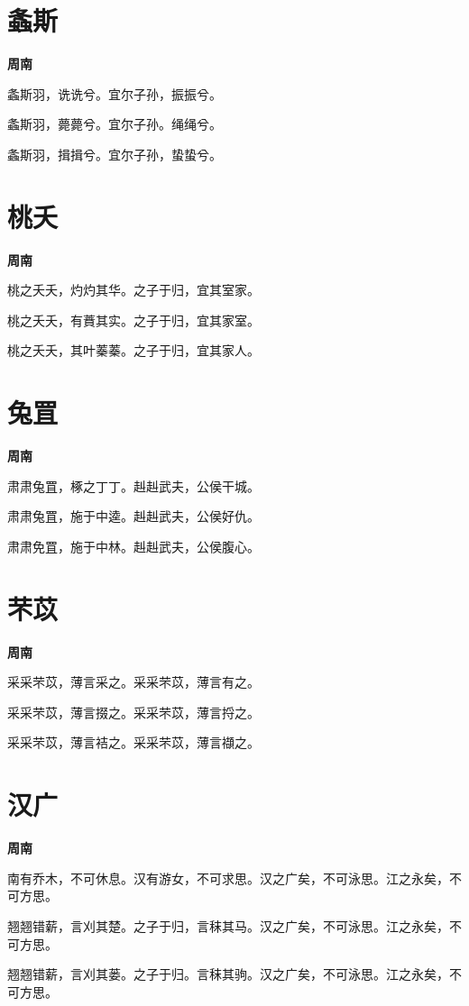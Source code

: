 \documentclass[12pt,a4paper]{ctexbook}
\begin{document}
\section{螽斯}
\textbf{周南}\par\vspace{0.5em}
螽斯羽，诜诜兮。宜尔子孙，振振兮。\par
螽斯羽，薨薨兮。宜尔子孙。绳绳兮。\par
螽斯羽，揖揖兮。宜尔子孙，蛰蛰兮。\par

\section{桃夭}
\textbf{周南}\par\vspace{0.5em}
桃之夭夭，灼灼其华。之子于归，宜其室家。\par
桃之夭夭，有蕡其实。之子于归，宜其家室。\par
桃之夭夭，其叶蓁蓁。之子于归，宜其家人。\par

\section{兔罝}
\textbf{周南}\par\vspace{0.5em}
肃肃兔罝，椓之丁丁。赳赳武夫，公侯干城。\par
肃肃兔罝，施于中逵。赳赳武夫，公侯好仇。\par
肃肃免罝，施于中林。赳赳武夫，公侯腹心。\par

\section{芣苡}
\textbf{周南}\par\vspace{0.5em}
采采芣苡，薄言采之。采采芣苡，薄言有之。\par
采采芣苡，薄言掇之。采采芣苡，薄言捋之。\par
采采芣苡，薄言袺之。采采芣苡，薄言襭之。\par

\section{汉广}
\textbf{周南}\par\vspace{0.5em}
南有乔木，不可休息。汉有游女，不可求思。汉之广矣，不可泳思。江之永矣，不可方思。\par
翘翘错薪，言刈其楚。之子于归，言秣其马。汉之广矣，不可泳思。江之永矣，不可方思。\par
翘翘错薪，言刈其蒌。之子于归。言秣其驹。汉之广矣，不可泳思。江之永矣，不可方思。\par
\end{document}
